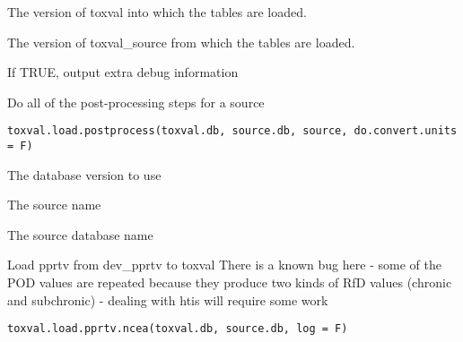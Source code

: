 \documentclass[letterpaper]{book}
\begin{document}
%
\begin{Arguments}
\begin{ldescription}
\item[\code{toxval.db}] The version of toxval into which the tables are loaded.

\item[\code{source.db}] The version of toxval\_source from which the tables are loaded.

\item[\code{verbose}] If TRUE, output extra debug information
\end{ldescription}
\end{Arguments}
%
\begin{Description}\relax
Do all of the post-processing steps for a source
\end{Description}
%
\begin{Usage}
\begin{verbatim}
toxval.load.postprocess(toxval.db, source.db, source, do.convert.units = F)
\end{verbatim}
\end{Usage}
%
\begin{Arguments}
\begin{ldescription}
\item[\code{toxval.db}] The database version to use

\item[\code{source}] The source name

\item[\code{sourcedb}] The source database name
\end{ldescription}
\end{Arguments}
%
\begin{Description}\relax
Load pprtv from dev\_pprtv to toxval
There is a known bug here - some of the POD values are repeated because they produce
two kinds of RfD values (chronic and subchronic) - dealing with htis will require
some work
\end{Description}
%
\begin{Usage}
\begin{verbatim}
toxval.load.pprtv.ncea(toxval.db, source.db, log = F)
\end{verbatim}
\end{Usage}
\end{document}
